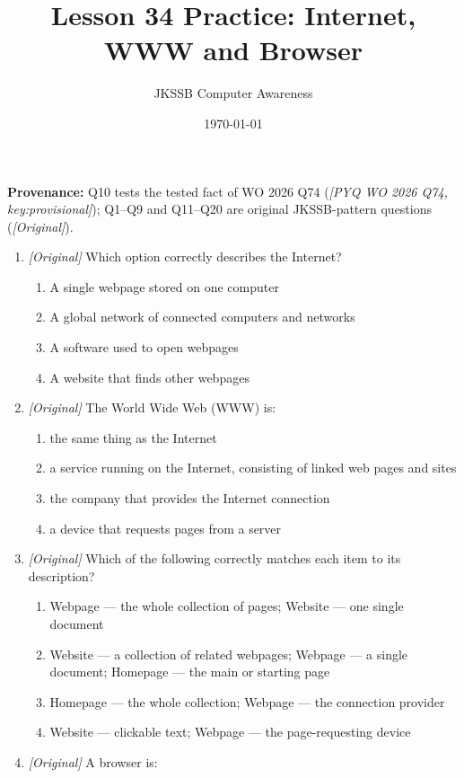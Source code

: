 \documentclass[11pt]{article}
\title{Lesson 34 Practice: Internet, WWW and Browser}
\author{JKSSB Computer Awareness}
\date{\today}
\begin{document}
\maketitle
\noindent\textbf{Provenance:} Q10 tests the tested fact of WO 2026 Q74
(\textit{[PYQ WO 2026 Q74, key:provisional]}); Q1--Q9 and Q11--Q20 are
original JKSSB-pattern questions (\textit{[Original]}).

\begin{enumerate}[label=\textbf{Q\arabic*.}, leftmargin=*]
\item \textit{[Original]} Which option correctly describes the Internet?
  \begin{enumerate}[label=\Alph*.]
    \item A single webpage stored on one computer
    \item A global network of connected computers and networks
    \item A software used to open webpages
    \item A website that finds other webpages
  \end{enumerate}
\item \textit{[Original]} The World Wide Web (WWW) is:
  \begin{enumerate}[label=\Alph*.]
    \item the same thing as the Internet
    \item a service running on the Internet, consisting of linked web pages
      and sites
    \item the company that provides the Internet connection
    \item a device that requests pages from a server
  \end{enumerate}
\item \textit{[Original]} Which of the following correctly matches each item
  to its description?
  \begin{enumerate}[label=\Alph*.]
    \item Webpage --- the whole collection of pages; Website --- one single
      document
    \item Website --- a collection of related webpages; Webpage --- a single
      document; Homepage --- the main or starting page
    \item Homepage --- the whole collection; Webpage --- the connection
      provider
    \item Website --- clickable text; Webpage --- the page-requesting device
  \end{enumerate}
\item \textit{[Original]} A browser is:

\end{enumerate}
\end{document}
